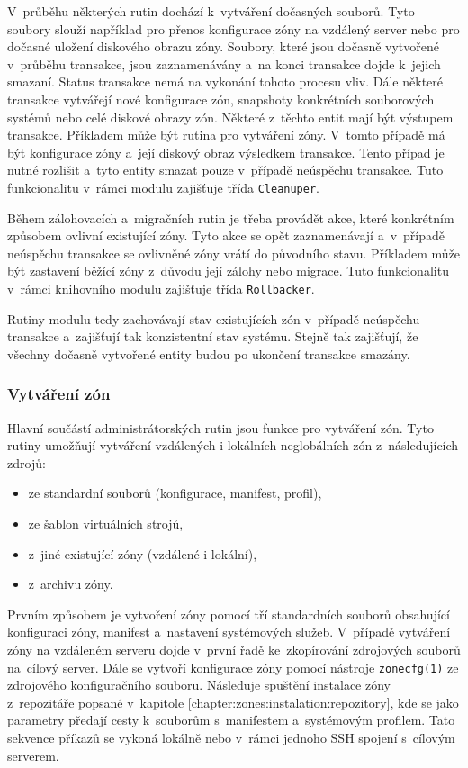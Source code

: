 V~průběhu některých rutin dochází k~vytváření dočasných souborů. Tyto soubory slouží například pro přenos konfigurace zóny
na vzdálený server nebo pro dočasné uložení diskového obrazu zóny. Soubory, které jsou dočasně vytvořené v~průběhu transakce, jsou
zaznamenávány a~na konci transakce dojde k~jejich smazaní. Status transakce nemá na vykonání tohoto procesu vliv.
Dále některé transakce vytvářejí nové konfigurace zón, snapshoty konkrétních souborových systémů nebo celé diskové obrazy zón. 
Některé z~těchto entit mají být výstupem transakce. Příkladem může být rutina pro vytváření zóny. V~tomto případě 
má být konfigurace zóny a~její diskový obraz výsledkem transakce. Tento případ je nutné rozlišit a~tyto entity smazat pouze 
v~případě neúspěchu transakce. Tuto funkcionalitu v~rámci modulu zajišťuje třída \verb|Cleanuper|.

Během zálohovacích a~migračních rutin je třeba provádět akce, které konkrétním způsobem ovlivní existující zóny. Tyto akce se opět
zaznamenávají a~v~případě neúspěchu transakce se ovlivněné zóny vrátí do původního stavu. Příkladem může být zastavení běžící
zóny z~důvodu její zálohy nebo migrace. Tuto funkcionalitu v~rámci knihovního modulu zajišťuje třída \verb|Rollbacker|.

Rutiny modulu tedy zachovávají stav existujících zón v~případě neúspěchu transakce a~zajišťují tak konzistentní stav systému. Stejně
tak zajišťují, že všechny dočasně vytvořené entity budou po ukončení transakce smazány.
\subsubsection{Vytváření zón}
\label{chapter:implementation:szones:routines:creation}
Hlavní součástí administrátorských rutin jsou funkce pro vytváření zón. Tyto rutiny umožňují vytváření vzdálených i
lokálních neglobálních zón z~následujících zdrojů:
\begin{itemize}
 \item ze standardní souborů (konfigurace, manifest, profil),
 \item ze šablon virtuálních strojů,
 \item z~jiné existující zóny (vzdálené i lokální),
 \item z~archivu zóny.
\end{itemize}
Prvním způsobem je vytvoření zóny pomocí tří standardních souborů obsahující konfiguraci zóny, manifest a~nastavení systémových
služeb. V~případě vytváření zóny na vzdáleném serveru dojde v~první řadě ke~zkopírování zdrojových souborů na~cílový server.
Dále se vytvoří konfigurace zóny pomocí nástroje \verb|zonecfg(1)| ze zdrojového konfiguračního souboru. Následuje spuštění
instalace zóny z~repozitáře popsané v~kapitole \ref{chapter:zones:instalation:repozitory}, kde se jako parametry předají
cesty k~souborům s~manifestem a~systémovým profilem. Tato sekvence příkazů se vykoná lokálně nebo v~rámci jednoho SSH spojení
s~cílovým serverem.

